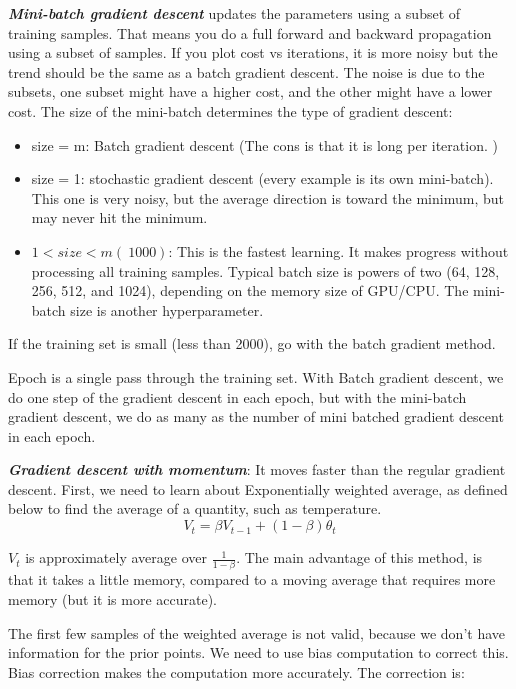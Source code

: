 \documentclass[12pt]{report}
\begin{document}
\textbf{\textit{Mini-batch gradient descent}} updates the parameters using a subset of training samples. That means you do a full forward and backward propagation using a subset of samples. If you plot cost vs iterations, it is more noisy but the trend should be the same as a batch gradient descent. The noise is due to the subsets, one subset might have a higher cost, and the other might have a lower cost. The size of the mini-batch determines the type of gradient descent:

\begin{itemize}
  \item size = m: Batch gradient descent (The cons is that it is long per iteration. )
  \item size = 1: stochastic gradient descent (every example is its own mini-batch). This one is very noisy, but the average direction is toward the minimum, but may never hit the minimum.
  \item $1< size < m (~1000)$: This is the fastest learning. It makes progress without processing all training samples. Typical batch size is powers of two (64, 128, 256, 512, and 1024), depending on the memory size of GPU/CPU. The mini-batch size is another hyperparameter.
\end{itemize}

If the training set is small (less than 2000), go with the batch gradient method.

Epoch is a single pass through the training set. With Batch gradient descent, we do one step of the gradient descent in each epoch, but with the mini-batch gradient descent, we do as many as the number of mini batched gradient descent in each epoch.

\textbf{\textit{Gradient descent with momentum}}: It moves faster than the regular gradient descent. First, we need to learn about Exponentially weighted average, as defined below to find the average of a quantity, such as temperature.
\begin{equation}
  V_t = \beta V_{t-1} + (1-\beta) \theta_t
\end{equation}

$V_t$ is approximately average over $\frac{1}{1-\beta}$. The main advantage of this method, is that it takes a little memory, compared to a moving average that requires more memory (but it is more accurate).

The first few samples of the weighted average is not valid, because we don't have information for the prior points. We need to use bias computation to correct this. Bias correction makes the computation more accurately. The correction is:
\end{document}
